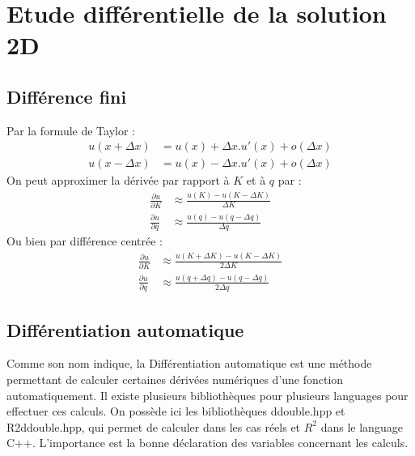 \documentclass{book}
\begin{document}
\section{Etude différentielle de la solution 2D}
\subsection{Différence fini}
Par la formule de Taylor :
               \[\begin{split}
			u(x+\Delta x)&=u(x)+ \Delta x.u'(x) +o(\Delta x) \\
		        u(x-\Delta x)&=u(x)- \Delta x.u'(x) +o(\Delta x) 
		\end{split}\]
On peut approximer la dérivée par rapport à $K$ et à $q$ par :
\[
	\begin{split}
		\frac{\partial u}{\partial K} &\approx \frac{u(K)-u(K-\Delta K)}{\Delta K}\\
		\frac{\partial u}{\partial q} &\approx \frac{u(q)-u(q-\Delta q)}{\Delta q}
	\end{split}
\]
Ou bien par différence centrée :
\[
	\begin{split}
		\frac{\partial u}{\partial K} &\approx \frac{u(K+\Delta K)-u(K-\Delta K)}{2\Delta K}\\
		\frac{\partial u}{\partial q} &\approx \frac{u(q+\Delta q)-u(q-\Delta q)}{2\Delta q}
	\end{split}
\]
\subsection{Différentiation automatique}
Comme son nom indique, la Différentiation automatique est une méthode permettant de calculer certaines dérivées numériques d'une fonction automatiquement. Il existe plusieurs bibliothèques pour plusieurs languages pour effectuer ces calculs. On possède ici les bibliothèques ddouble.hpp et R2ddouble.hpp, qui permet de calculer dans les cas réels et $R^2$ dans le language C++. L'importance est la bonne déclaration des variables concernant les calculs. 
\end{document}
